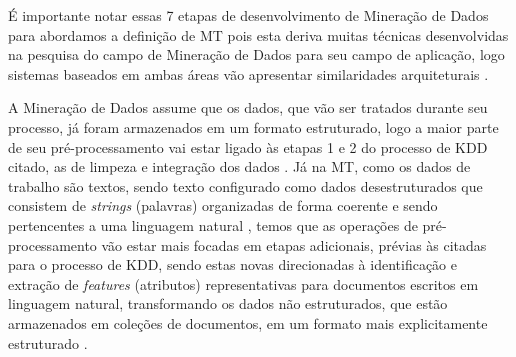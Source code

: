 
É importante notar essas 7 etapas de desenvolvimento de Mineração de Dados para abordamos a definição de MT pois esta deriva muitas técnicas desenvolvidas na pesquisa do campo de Mineração de Dados para seu campo de aplicação, logo sistemas baseados em ambas áreas vão apresentar similaridades arquiteturais \cite{Feldman:2006:TMH:1076381}. 



A Mineração de Dados assume que os dados, que vão ser tratados durante seu processo, já foram armazenados em um formato estruturado, logo a maior parte de seu pré-processamento vai estar ligado às etapas 1 e 2 do processo de KDD citado, as de limpeza e integração dos dados \cite{Feldman:2006:TMH:1076381}. %
Já na MT, como os dados de trabalho são textos, sendo texto configurado como dados desestruturados que consistem de \textit{strings} (palavras) organizadas de forma coerente e sendo pertencentes a uma linguagem natural \cite{Jo2018TMCIBDC}, temos que as operações de pré-processamento vão estar mais focadas em etapas adicionais, prévias às citadas para o processo de KDD, sendo estas novas direcionadas à identificação e extração de \textit{features} (atributos) representativas para documentos escritos em linguagem natural, transformando os dados não estruturados, que estão armazenados em coleções de documentos, em um formato mais explicitamente estruturado \cite{Feldman:2006:TMH:1076381}.

